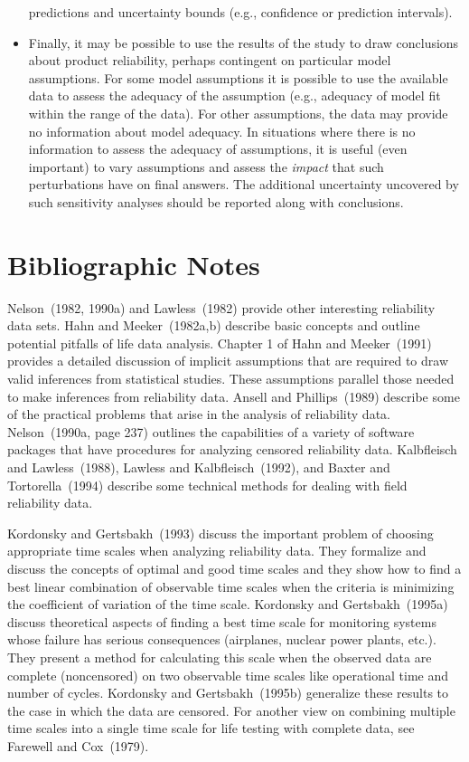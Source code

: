 \begin{itemize}
predictions and uncertainty bounds (e.g., confidence or prediction
intervals).
\item
Finally, it may be possible to use the results of the study to draw
conclusions about product reliability, perhaps contingent on
particular model assumptions. For some model assumptions it is
possible to use the available data to assess the adequacy of the
assumption (e.g., adequacy of model fit within the range of the data).
For other assumptions, the data may provide no information about model
adequacy.  In situations where there is no information to assess the
adequacy of assumptions, it is useful (even important) to vary
assumptions and assess the {\em impact} that such perturbations have
on final answers. The additional uncertainty uncovered by such
sensitivity analyses should be reported along with conclusions.
\end{itemize}



\section*{Bibliographic Notes}

Nelson~(1982, 1990a) and Lawless~(1982) provide other interesting
reliability data sets. Hahn and Meeker~(1982a,b) describe basic
concepts and outline potential pitfalls of life data analysis.
Chapter 1 of Hahn and Meeker~(1991) provides a detailed discussion of
implicit assumptions that are required to draw valid inferences from
statistical studies. These assumptions parallel those needed to make
inferences from reliability data.  Ansell and Phillips~(1989) describe
some of the practical problems that arise in the analysis of
reliability data. Nelson~(1990a, page 237) outlines the capabilities
of a variety of software packages that have procedures for analyzing
censored reliability data.  Kalbfleisch and Lawless~(1988), Lawless
and Kalbfleisch~(1992), and Baxter and Tortorella~(1994) describe some
technical methods for dealing with field reliability data.

Kordonsky and Gertsbakh~(1993) discuss the important problem of
choosing appropriate time scales when analyzing reliability data. They
formalize and discuss the concepts of optimal and good time scales and
they show how to find a best linear combination of observable time
scales when the criteria is minimizing the coefficient of variation of
the time scale.  Kordonsky and Gertsbakh~(1995a) discuss theoretical
aspects of finding a best time scale for monitoring systems whose
failure has serious consequences (airplanes, nuclear power plants,
etc.). They present a method for calculating this scale when the
observed data are complete (noncensored) on two observable time scales
like operational time and number of cycles.  Kordonsky and
Gertsbakh~(1995b) generalize these results to the case in which the
data are censored.  For another view on combining multiple time scales
into a single time scale for life testing with complete data, see
Farewell and Cox~(1979).




